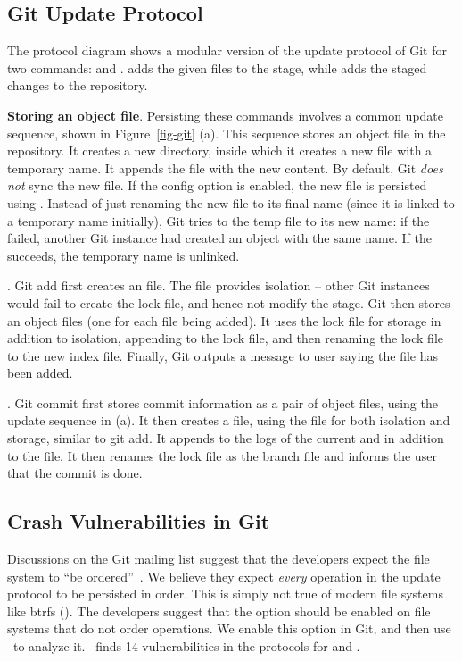 \subsection{Git Update Protocol}
\label{sec-protocol-explain}
The protocol diagram shows a modular version of the update protocol of Git for
two commands:  and .  adds
the given files to the stage, while  adds the staged changes
to the repository.

\textbf{Storing an object file}. Persisting these commands involves a common
update sequence, shown in Figure~\ref{fig-git} (a). This sequence stores an
object file in the repository. It creates a new directory, inside which it
creates a new file with a temporary name. It appends the file with the new
content. By default, Git \textit{does not} sync the new file. If the config
option  is enabled, the new file is persisted
using .  Instead of just renaming the new file to its final
name (since it is linked to a temporary name initially), Git tries to
 the temp file to its new name: if the  failed,
another Git instance had created an object with the same name. If the
 succeeds, the temporary name is unlinked. 

\textbf{}. Git add first creates an  file.
The file provides isolation -- other Git instances would fail to create the
lock file, and hence not modify the stage. Git then stores an object files (one
for each file being added). It uses the lock file for storage in addition to
isolation, appending to the lock file, and then renaming the lock file to
the new index file. Finally, Git outputs a message to user saying the file
has been added.   

\textbf{}. Git commit first stores commit information as a
pair of object files, using the update sequence in (a). It then creates a
 file, using the file for both isolation and storage,
similar to git add. It appends to the logs of the current  and
 in addition to the  file. It then renames
the lock file as the branch file and informs the user that the commit is done. 

\subsection{Crash Vulnerabilities in Git}
\label{sec-git-vul}
Discussions on the Git mailing list suggest that the developers expect the file
system to ``be ordered''~\cite{git-linus, git-jeff}. We believe they expect
\textit{every} operation in the update protocol to be persisted in order. This
is simply not true of modern file systems like btrfs
(). The developers suggest that the option
 should be enabled on file systems that do not
order operations. We enable this option in Git, and then use \toolname\ to 
analyze it. \toolname\ finds 14 vulnerabilities in the
protocols for  and .

